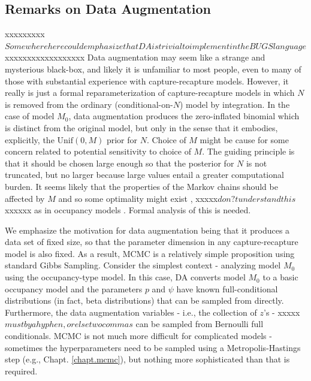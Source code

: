 \subsection{Remarks on Data Augmentation}

xxxxxxxxx$Somewhere here could emphasize that DA is trivial to implement in the BUGS language$xxxxxxxxxxxxxxxxxx
Data augmentation may seem like a strange and mysterious black-box,
and likely it is unfamiliar to most people, even to many of those with substantial
experience with capture-recapture models. However, it really is just a
formal reparameterization of capture-recapture models in which $N$ is
removed from the ordinary (conditional-on-$N$) model by integration.
In the case of model $M_0$, data augmentation produces the zero-inflated
binomial which is distinct from the original model, but
only in the sense that it embodies, explicitly, the $\mbox{Unif}(0,M)$
prior for $N$.  Choice of $M$ might be cause for some concern related
to potential sensitivity to choice of $M$. The guiding principle is
that it should be chosen large enough so that the posterior for $N$ is
not truncated, but no larger because large values entail a greater 
computational burden. It seems likely that the properties of the
Markov chains should be affected by $M$ and so some optimality might
exist \citep{gopalaswamy_etal:2012}, xxxxx$don?t understand this$xxxxxx as in occupancy models
\citep{mackenzie_royle:2005}. Formal analysis of this is needed.


We emphasize the motivation for data augmentation being that it
produces a data set of fixed size, so that the parameter dimension in
any capture-recapture model is also fixed.  As a result, MCMC is a
relatively simple proposition using standard Gibbs Sampling.  Consider
the simplest context - analyzing model $M_0$ using the occupancy-type
model. In this case, DA converts model $M_0$ to a basic occupancy model
and the parameters $p$ and $\psi$ have known full-conditional
distributions (in fact, beta distributions) that can be sampled from
directly.  Furthermore, the data augmentation variables - i.e., the collection 
of $z$'s - xxxxx $must by a hyphen, or else two commas$ can be sampled from Bernoulli full
conditionals. MCMC is not much more difficult for complicated
models - sometimes the hyperparameters need to be sampled using a
Metropolis-Hastings step (e.g., Chapt. \ref{chapt.mcmc}), but nothing more sophisticated than that is
required.

